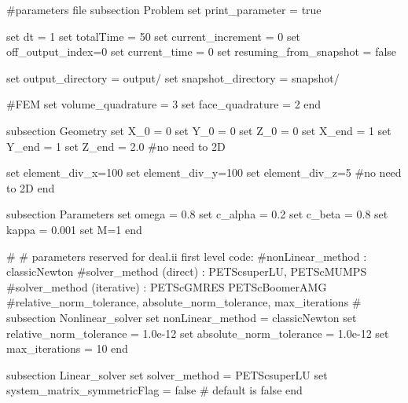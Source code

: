 \begin{DoxyCode}
\textcolor{preprocessor}{#parameters file}
\textcolor{preprocessor}{}
subsection Problem
set print\_parameter = \textcolor{keyword}{true}

set dt = 1
set totalTime = 50
set current\_increment = 0
set off\_output\_index=0
set current\_time = 0
set resuming\_from\_snapshot = \textcolor{keyword}{false}

set output\_directory = output/
set snapshot\_directory = snapshot/

\textcolor{preprocessor}{#FEM}
\textcolor{preprocessor}{}set volume\_quadrature = 3 
set face\_quadrature = 2 
end

subsection Geometry
set X\_0 = 0
set Y\_0 = 0
set Z\_0 = 0
set X\_end = 1 
set Y\_end = 1
set Z\_end = 2.0 #no need to 2D

set element\_div\_x=100
set element\_div\_y=100
set element\_div\_z=5 #no need to 2D
end

subsection Parameters
set omega = 0.8
set c\_alpha = 0.2
set c\_beta = 0.8
set kappa = 0.001
set M=1
end
                        
\textcolor{preprocessor}{#}
\textcolor{preprocessor}{}\textcolor{preprocessor}{# parameters reserved for deal.ii first level code:}
\textcolor{preprocessor}{}\textcolor{preprocessor}{#nonLinear\_method : classicNewton}
\textcolor{preprocessor}{}\textcolor{preprocessor}{#solver\_method (direct) : PETScsuperLU, PETScMUMPS}
\textcolor{preprocessor}{}\textcolor{preprocessor}{#solver\_method (iterative) : PETScGMRES PETScBoomerAMG}
\textcolor{preprocessor}{}\textcolor{preprocessor}{#relative\_norm\_tolerance, absolute\_norm\_tolerance, max\_iterations}
\textcolor{preprocessor}{}\textcolor{preprocessor}{#}
\textcolor{preprocessor}{}subsection Nonlinear\_solver
        set nonLinear\_method = classicNewton
        set relative\_norm\_tolerance = 1.0e-12
        set absolute\_norm\_tolerance = 1.0e-12
        set max\_iterations = 10
end
                        
subsection Linear\_solver
        set solver\_method = PETScsuperLU
        set system\_matrix\_symmetricFlag = \textcolor{keyword}{false} # \textcolor{keywordflow}{default} is \textcolor{keyword}{false}
end
\end{DoxyCode}
 